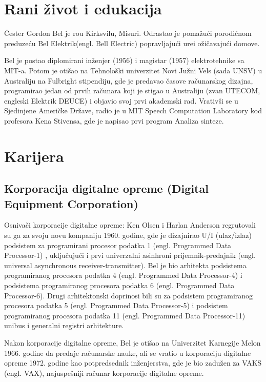 \documentclass[a4paper]{article}
\begin{document}
{\section{Rani život i edukacija}
\label{sec:uvod}
Čester Gordon Bel je ro\djen u Kirksvilu, Misuri. Odrastao je pomažući porodičnom preduzeću Bel Elektrik(engl. Bell Electric) popravljajući ure\djaje i ožičavajući domove\cite{bel1}.

Bel je postao diplomirani inženjer (1956) i magistar (1957) elektrotehnike sa MIT-a. Potom je otišao na Tehnološki univerzitet Novi Južni Vels (sada UNSV) u Australiju na Fulbright stipendiju, gde je predavao časove računarskog dizajna, programirao jedan od prvih računara koji je stigao u Australiju (zvan UTECOM, engleski Elektrik DEUCE) i objavio svoj prvi akademski rad. Vrativši se u Sjedinjene Američke Države, radio je u MIT Speech Computation Laboratory kod profesora Kena Stivensa, gde je napisao prvi program Analiza sinteze.

\section{Karijera}
\subsection{Korporacija digitalne opreme (Digital Equipment Corporation)}
\label{subsec:podnaslov1}

Osnivači korporacije digitalne opreme: Ken Olsen i Harlan Anderson regrutovali su ga za svoju novu kompaniju 1960. godine, gde je dizajnirao U/I (ulaz/izlaz) podsistem za programirani procesor podatka 1 (engl. Programmed Data Processor-1) , uključujući i prvi univerzalni asinhroni prijemnik-predajnik (engl. universal asynchronous receiver-transmitter). Bel je bio arhitekta podsistema programiranog procesora podatka 4 (engl. Programmed Data Processor-4) i podsistema programiranog procesora podatka 6 (engl. Programmed Data Processor-6). Drugi arhitektonski doprinosi bili su za podsistem programiranog procesora podatka 5 (engl. Programmed Data Processor-5) i podsistem programiranog procesora podatka 11 (engl. Programmed Data Processor-11) unibus i generalni registri arhitekture. \cite{bel2}

Nakon korporacije digitalne opreme, Bel je otišao na Univerzitet Karnegije Melon 1966. godine da predaje računarske nauke, ali se vratio u korporaciju digitalne opreme 1972. godine kao potpredsednik inženjerstva, gde je bio zadužen za VAKS (engl. VAX), najuspešniji računar korporacije digitalne opreme.

}
\end{document}
